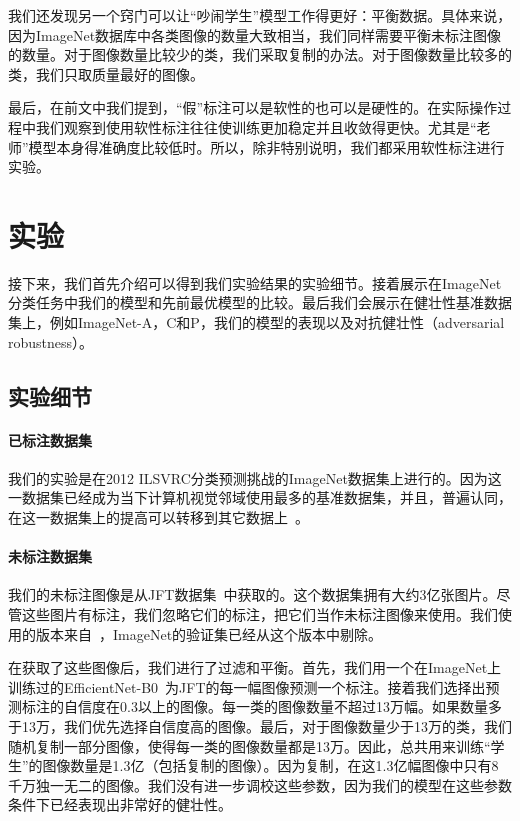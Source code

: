 \documentclass[10pt]{article}
\begin{document}
我们还发现另一个窍门可以让“吵闹学生”模型工作得更好：平衡数据。具体来说，因为ImageNet数据库中各类图像的数量大致相当，我们同样需要平衡未标注图像的数量。对于图像数量比较少的类，我们采取复制的办法。对于图像数量比较多的类，我们只取质量最好的图像。  


最后，在前文中我们提到，“假”标注可以是软性的也可以是硬性的。在实际操作过程中我们观察到使用软性标注往往使训练更加稳定并且收敛得更快。尤其是“老师”模型本身得准确度比较低时。所以，除非特别说明，我们都采用软性标注进行实验。  

\section{实验}
接下来，我们首先介绍可以得到我们实验结果的实验细节。接着展示在ImageNet分类任务中我们的模型和先前最优模型的比较。最后我们会展示在健壮性基准数据集上，例如ImageNet-A，C和P，我们的模型的表现以及对抗健壮性（adversarial robustness）。  

\subsection{实验细节}

\paragraph{已标注数据集 }
我们的实验是在2012 ILSVRC分类预测挑战的ImageNet数据集上进行的。因为这一数据集已经成为当下计算机视觉邻域使用最多的基准数据集，并且，普遍认同，在这一数据集上的提高可以转移到其它数据上~\cite{kornblith2019better,recht2019imagenet}。 

\paragraph{未标注数据集}
我们的未标注图像是从JFT数据集~\cite{hinton2015distilling, chollet2017xception}中获取的。这个数据集拥有大约3亿张图片。尽管这些图片有标注，我们忽略它们的标注，把它们当作未标注图像来使用。我们使用的版本来自~\cite{ngiam2018domain}，ImageNet的验证集已经从这个版本中剔除。  


在获取了这些图像后，我们进行了过滤和平衡。首先，我们用一个在ImageNet上训练过的EfficientNet-B0~\cite{tan2019efficientnet}为JFT的每一幅图像预测一个标注。接着我们选择出预测标注的自信度在0.3以上的图像。每一类的图像数量不超过13万幅。如果数量多于13万，我们优先选择自信度高的图像。最后，对于图像数量少于13万的类，我们随机复制一部分图像，使得每一类的图像数量都是13万。因此，总共用来训练“学生”的图像数量是1.3亿（包括复制的图像）。因为复制，在这1.3亿幅图像中只有8千万独一无二的图像。我们没有进一步调校这些参数，因为我们的模型在这些参数条件下已经表现出非常好的健壮性。  
\end{document}
